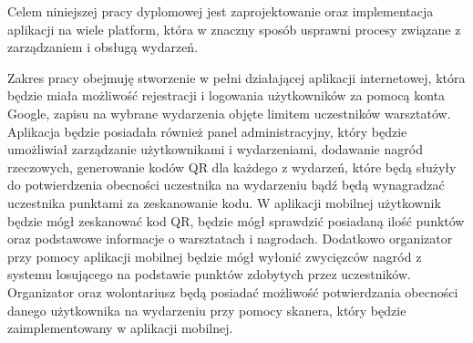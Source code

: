 Celem niniejszej pracy dyplomowej jest zaprojektowanie oraz implementacja aplikacji na wiele platform, która w znaczny sposób usprawni procesy związane z zarządzaniem i obsługą wydarzeń.

Zakres pracy obejmuję stworzenie w pełni działającej aplikacji internetowej, która będzie miała możliwość rejestracji i logowania użytkowników za pomocą konta Google, zapisu na wybrane wydarzenia objęte limitem uczestników warsztatów. Aplikacja będzie posiadała również panel administracyjny, który będzie umożliwiał zarządzanie użytkownikami i wydarzeniami, dodawanie nagród rzeczowych, generowanie kodów QR dla każdego z wydarzeń, które będą służyły do potwierdzenia obecności uczestnika na wydarzeniu bądź będą wynagradzać uczestnika punktami za zeskanowanie kodu. W aplikacji mobilnej użytkownik będzie mógł zeskanować kod QR, będzie mógł sprawdzić posiadaną ilość punktów oraz podstawowe informacje o warsztatach i nagrodach. Dodatkowo organizator przy pomocy aplikacji mobilnej będzie mógł wyłonić zwycięzców nagród z systemu losującego na podstawie punktów zdobytych przez uczestników. Organizator oraz wolontariusz będą posiadać możliwość potwierdzania obecności danego użytkownika na wydarzeniu przy pomocy skanera, który będzie zaimplementowany w aplikacji mobilnej.


